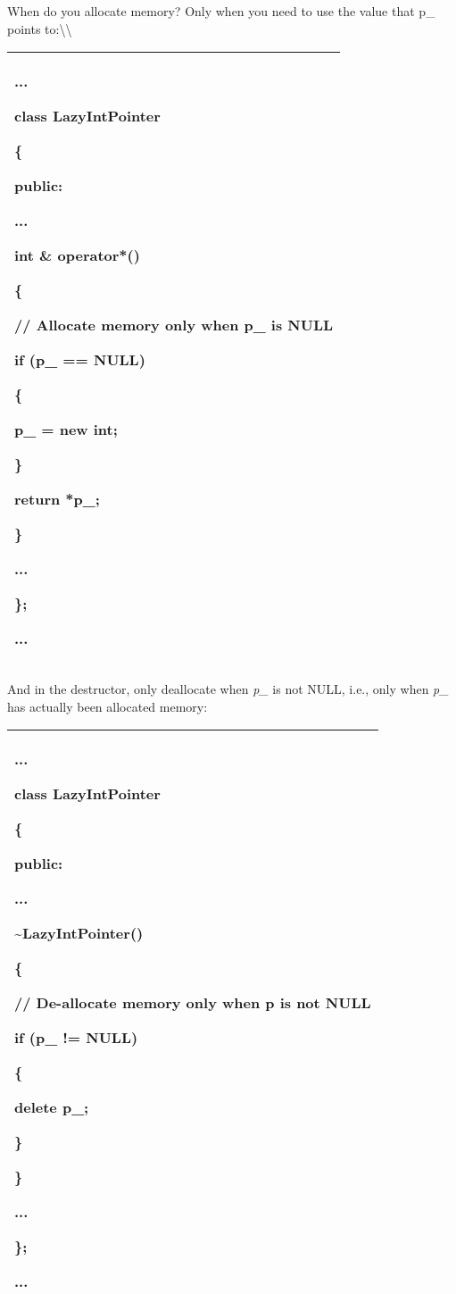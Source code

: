 \documentclass[
]{article}
\begin{document}
When do you allocate memory? Only when you need to use the value that
p\_ points to:\textbackslash\textbackslash{}

\begin{longtable}[]{@{}l@{}}
\toprule
\endhead
\begin{minipage}[t]{0.97\columnwidth}\raggedright
...

class LazyIntPointer

\{

public:

...

int \& operator*()

\{

// Allocate memory only when p\_ is NULL

if (p\_ == NULL)

\{

p\_ = new int;

\}

return *p\_;

\}

...

\};

...\strut
\end{minipage}\tabularnewline
\bottomrule
\end{longtable}

And in the destructor, only deallocate when \emph{p\_} is not NULL,
i.e., only when \emph{p\_} has actually been allocated memory:

\begin{longtable}[]{@{}l@{}}
\toprule
\endhead
\begin{minipage}[t]{0.97\columnwidth}\raggedright
...

class LazyIntPointer

\{

public:

...

\textasciitilde LazyIntPointer()

\{

// De-allocate memory only when p is not NULL

if (p\_ != NULL)

\{

delete p\_;

\}

\}

...

\};

...\strut
\end{minipage}\tabularnewline
\bottomrule
\end{longtable}
\end{document}
